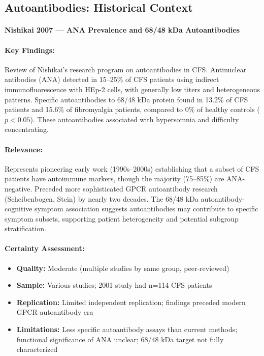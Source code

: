 \subsection{Autoantibodies: Historical Context}

\paragraph{Nishikai 2007 --- ANA Prevalence and 68/48 kDa Autoantibodies}

\cite{Nishikai2007}

\paragraph{Key Findings:}
Review of Nishikai's research program on autoantibodies in CFS. Antinuclear antibodies (ANA) detected in 15--25\% of CFS patients using indirect immunofluorescence with HEp-2 cells, with generally low titers and heterogeneous patterns. Specific autoantibodies to 68/48 kDa protein found in 13.2\% of CFS patients and 15.6\% of fibromyalgia patients, compared to 0\% of healthy controls ($p < 0.05$). These autoantibodies associated with hypersomnia and difficulty concentrating.

\paragraph{Relevance:}
Represents pioneering early work (1990s--2000s) establishing that a subset of CFS patients have autoimmune markers, though the majority (75--85\%) are ANA-negative. Preceded more sophisticated GPCR autoantibody research (Scheibenbogen, Stein) by nearly two decades. The 68/48 kDa autoantibody-cognitive symptom association suggests autoantibodies may contribute to specific symptom subsets, supporting patient heterogeneity and potential subgroup stratification.

\paragraph{Certainty Assessment:}
\begin{itemize}
    \item \textbf{Quality:} Moderate (multiple studies by same group, peer-reviewed)
    \item \textbf{Sample:} Various studies; 2001 study had n=114 CFS patients
    \item \textbf{Replication:} Limited independent replication; findings preceded modern GPCR autoantibody era
    \item \textbf{Limitations:} Less specific autoantibody assays than current methods; functional significance of ANA unclear; 68/48 kDa target not fully characterized
\end{itemize}

